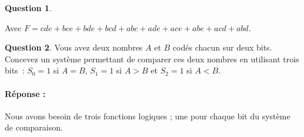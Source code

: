 \documentclass[11pt,a4paper]{article}
\theoremstyle{definition}%
\newtheorem{Q}{Question}[] %
\newcommand{\reponse}[1]{%
	\ifthenelse {\boolean{corrige}} {\paragraph{Réponse :} \color{darkblue}   #1\color{black}} {}
 }
\begin{document}
\begin{Q}
{	\begin{center}
	\end{center}

	Avec $F = cde + bce + bde + bcd + abc + ade + ace + abe + acd + abd$.
}
\end{Q}





\begin{Q}
Vous avez deux nombres $A$ et $B$ codés chacun sur deux bits.
Concevez un système permettant de comparer ces deux nombres en utilisant trois bits~: $S_0 = 1$ si $A = B$, $S_1 = 1$ si $A>B$ et $S_2 = 1$ si $A < B$.

\reponse{
	Nous avons besoin de trois fonctions logiques ; une pour chaque bit du système de comparaison.

}
\end{Q}
\end{document}
